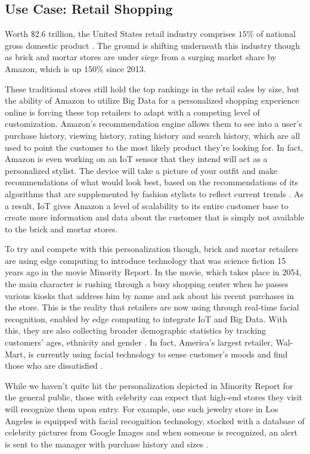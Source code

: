 \documentclass[sigconf]{acmart}
\begin{document}
\subsection{Use Case: Retail Shopping}
Worth $\$2.6$ trillion, the United States retail industry comprises $15\%$ of national gross domestic product \cite{retail}. The ground is shifting underneath this industry though as brick and mortar stores are under siege from a surging market share by Amazon, which is up $150\%$ since 2013. 

These traditional stores still hold the top rankings in the retail sales by size, but the ability of Amazon to utilize Big Data for a personalized shopping experience online is forcing these top retailers to adapt with a competing level of customization. Amazon's recommendation engine allows them to see into a user's purchase history, viewing history, rating history and search history, which are all used to point the customer to the most likely product they're looking for. In fact, Amazon is even working on an IoT sensor that they intend will act as a personalized stylist. The device will take a picture of your outfit and make recommendations of what would look best, based on the recommendations of its algorithms that are supplemented by fashion stylists to reflect current trends \cite{amznstyle}. As a result, IoT gives Amazon a level of scalability to its entire customer base to create more information and data about the customer that is simply not available to the brick and mortar stores. 

To try and compete with this personalization though, brick and mortar retailers are using edge computing to introduce technology that was science fiction 15 years ago in the movie Minority Report. In the movie, which takes place in 2054, the main character is rushing through a busy shopping center when he passes various kiosks that address him by name and ask about his recent purchases in the store. This is the reality that retailers are now using through real-time facial recognition, enabled by edge computing to integrate IoT and Big Data. With this, they are also collecting broader demographic statistics by tracking customers' ages, ethnicity and gender \cite{facialtech}. In fact, America's largest retailer, Wal-Mart, is currently using facial technology to sense customer's moods and find those who are dissatisfied \cite{walmart}. 

While we haven't quite hit the personalization depicted in Minority Report for the general public, those with celebrity can expect that high-end stores they visit will recognize them upon entry. For example, one such jewelry store in Los Angeles is equipped with facial recognition technology, stocked with a database of celebrity pictures from Google Images and when someone is recognized, an alert is sent to the manager with purchase history and sizes \cite{npr}. 
\end{document}
